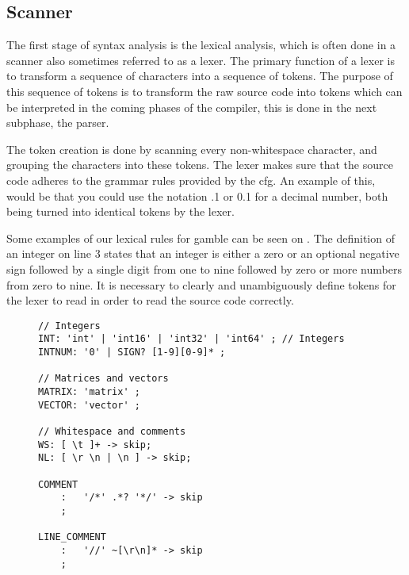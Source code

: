 \subsection*{Scanner}
The first stage of syntax analysis is the lexical analysis, which is often done in a scanner also sometimes referred to as a lexer.
The primary function of a lexer is to transform a sequence of characters into a sequence of tokens.
The purpose of this sequence of tokens is to transform the raw source code into tokens which can be interpreted in the coming phases of the compiler, this is done in the next subphase, the parser.
  
The token creation is done by scanning every non-whitespace character, and grouping the characters into these tokens.
The lexer makes sure that the source code adheres to the grammar rules provided by the \acrshort{cfg}.
An example of this, would be that you could use the notation .1 or 0.1 for a decimal number, both being turned into identical tokens by the lexer.

Some examples of our lexical rules for \gls{gamble} can be seen on .
The definition of an integer on line 3 states that an integer is either a zero or an optional negative sign followed by a single digit from one to nine followed by zero or more numbers from zero to nine.
It is necessary to clearly and unambiguously define tokens for the lexer to read in order to read the source code correctly. \citep{Crafting_book}
\begin{figure}
\begin{lstlisting}[caption=Example of our lexer rules for \gls{gamble},frame=tlrb,label={lst:token}]
// Integers
INT: 'int' | 'int16' | 'int32' | 'int64' ; // Integers
INTNUM: '0' | SIGN? [1-9][0-9]* ;

// Matrices and vectors
MATRIX: 'matrix' ;
VECTOR: 'vector' ;

// Whitespace and comments
WS: [ \t ]+ -> skip;
NL: [ \r \n | \n ] -> skip;

COMMENT
    :   '/*' .*? '*/' -> skip
    ;

LINE_COMMENT
    :   '//' ~[\r\n]* -> skip
    ;
\end{lstlisting} 
\end{figure}